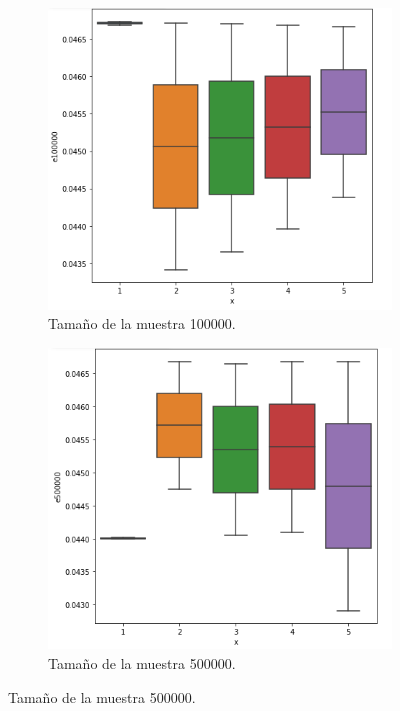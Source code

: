 \documentclass{article}
\begin{document}
\begin{figure}
		\begin{subfigure}[b]{0.45\linewidth}
			\includegraphics[width=\linewidth]{e100000.png}
			\caption{Tamaño de la muestra 100000.}
			\label{3}
	\end{subfigure}
		\begin{subfigure}[b]{0.45\linewidth}
				\includegraphics[width=\linewidth]{e500000.png}
				\caption{Tamaño de la muestra 500000.}
				\label{4}
	\end{subfigure}

\end{figure}
\end{document}
